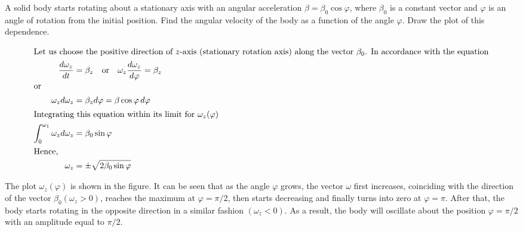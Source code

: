 
\item A solid body starts rotating about a stationary axis with an angular acceleration \(\beta = \beta_0 \cos \varphi\), where \(\beta_0\) is a constant vector and \(\varphi\) is an angle of rotation from the initial position. Find the angular velocity of the body as a function of the angle \(\varphi\). Draw the plot of this dependence.

\begin{solution}
    \begin{center}
    \end{center}
    
    \begin{align*}
        \intertext{Let us choose the positive direction of \(z\)-axis (stationary rotation axis) along the vector \(\beta_0\). In accordance with the equation}
        \frac{d\omega_z}{dt} &= \beta_z \quad \text{or} \quad \omega_z \frac{d\omega_z}{d\varphi} = \beta_z\\
        \intertext{or}
        \omega_z d\omega_z &= \beta_z d\varphi = \beta \cos \varphi \, d\varphi\\
        \intertext{Integrating this equation within its limit for \(\omega_z (\varphi)\)}
        \int_0^{\omega_1} \omega_z d\omega_z &= \beta_0 \sin \varphi\\
        \intertext{Hence,}
        \omega_z &= \pm \sqrt{2 \beta_0 \sin \varphi}
    \end{align*}

    The plot \(\omega_z(\varphi)\) is shown in the figure. It can be seen that as the angle \(\varphi\) grows, the vector \(\omega\) first increases, coinciding with the direction of the vector \(\beta_0 (\omega_z > 0)\), reaches the maximum at \(\varphi = \pi/2\), then starts decreasing and finally turns into zero at \(\varphi = \pi\). After that, the body starts rotating in the opposite direction in a similar fashion \((\omega_z < 0)\). As a result, the body will oscillate about the position \(\varphi = \pi/2\) with an amplitude equal to \(\pi/2\).
\end{solution}
